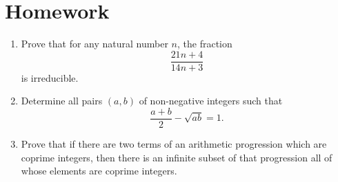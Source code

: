 \documentclass{article}
\begin{document}
\section{Homework}
  \begin{enumerate}
    \item Prove that for any natural number $n$, the fraction
      \[\frac{21n+4}{14n+3}\]
      is irreducible.
    \item Determine all pairs $(a,b)$ of non-negative integers such that
      \[\frac{a+b}2-\sqrt{ab}=1.\]
    \item Prove that if there are two terms of an arithmetic progression which are
      coprime integers, then there is an infinite subset of that
      progression all of whose elements are coprime integers.
  \end{enumerate}
\end{document}
